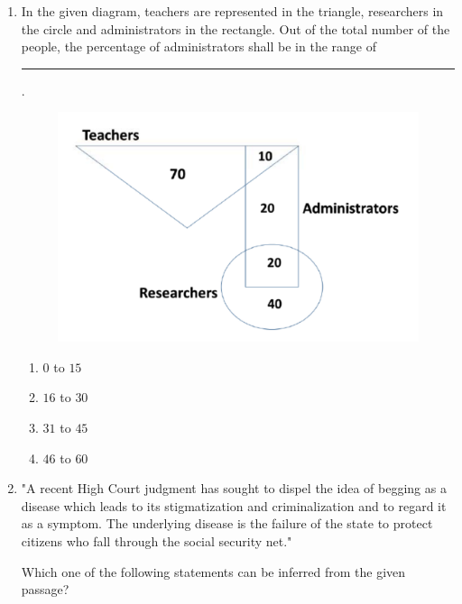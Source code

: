 \documentclass[journal,12pt,onecolumn]{IEEEtran}
\theoremstyle{remark}
\begin{document}
\begin{enumerate}
\hfill{}
\begin{multicols}{4}
    \begin{enumerate}
        \item P
        \item R
        \item S
        \item Q
    \end{enumerate}
\end{multicols}

    \item In the given diagram, teachers are represented in the triangle, researchers in the circle and administrators in the rectangle. Out of the total number of the people, the percentage of administrators shall be in the range of \rule{1cm}{0.1mm} .
    
\hfill{}
\begin{figure}[H]
    \centering
	\includegraphics[width=0.5\linewidth]{Fig/7i.png}
    \caption{}
    \label{fig:7i}
\end{figure}

\begin{multicols}{4}
    \begin{enumerate}
        \item $0$ to $15$
        \item $16$ to $30$
        \item $31$ to $45$
        \item $46$ to $60$
    \end{enumerate}
\end{multicols}

    \item "A recent High Court judgment has sought to dispel the idea of begging as a disease which leads to its stigmatization and criminalization and to regard it as a symptom. The underlying disease is the failure of the state to protect citizens who fall through the social security net."

Which one of the following statements can be inferred from the given passage?


\end{enumerate}
\end{document}
